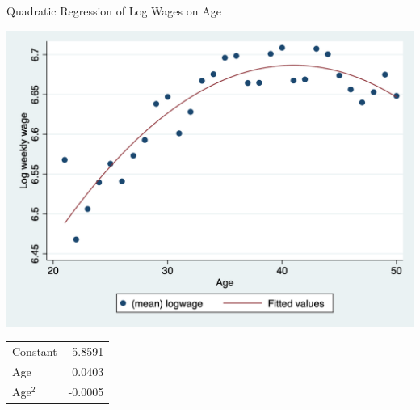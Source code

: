 \documentclass[11pt,english,handout]{beamer}
\begin{document}
	

		
	
	
		
	
	
		
	
	\begin{frame}{Quadratic Regression of Log Wages on Age} 
	\begin{center}
	\includegraphics[width = 0.8 \linewidth]{logwages-quadratic}
	
	\begin{tabular}{lr}
	Constant & 5.8591 \\
	Age & 0.0403 \\
	Age$^2$ & -0.0005
	\end{tabular}
	
	\end{center}
	
	\end{frame}
	
\end{document}
